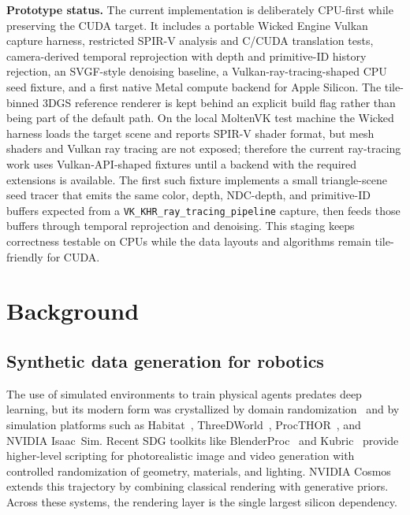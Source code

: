 \documentclass[10pt,journal,onecolumn]{IEEEtran}
\begin{document}
\textbf{Prototype status.} The current implementation is deliberately
CPU-first while preserving the CUDA target. It includes a portable
Wicked Engine Vulkan capture harness, restricted SPIR-V analysis and
C/CUDA translation tests, camera-derived temporal reprojection with
depth and primitive-ID history rejection, an SVGF-style denoising
baseline, a Vulkan-ray-tracing-shaped CPU seed fixture, and a first
native Metal compute backend for Apple Silicon. The
tile-binned 3DGS reference renderer is kept behind an explicit build
flag rather than being part of the default path. On the local MoltenVK
test machine the Wicked harness loads the target scene and reports
SPIR-V shader format, but mesh shaders and Vulkan ray tracing are not
exposed; therefore the current ray-tracing work uses
Vulkan-API-shaped fixtures until a backend with the required extensions
is available. The first such fixture implements a small triangle-scene
seed tracer that emits the same color, depth, NDC-depth, and
primitive-ID buffers expected from a
\texttt{VK\_KHR\_ray\_tracing\_pipeline} capture, then feeds those
buffers through temporal reprojection and denoising. This staging keeps
correctness testable on CPUs while the data layouts and algorithms
remain tile-friendly for CUDA.

\section{Background}\label{sec:bg}

\subsection{Synthetic data generation for robotics}

The use of simulated environments to train physical agents predates deep
learning, but its modern form was crystallized by domain
randomization~\cite{tobin2017domain} and by simulation platforms such as
Habitat~\cite{savva2019habitat}, ThreeDWorld~\cite{gan2020threedworld},
ProcTHOR~\cite{deitke2022procthor}, and NVIDIA Isaac~Sim. Recent SDG
toolkits like BlenderProc~\cite{denninger2019blenderproc} and
Kubric~\cite{greff2022kubric} provide higher-level scripting for
photorealistic image and video generation with controlled randomization
of geometry, materials, and lighting. NVIDIA Cosmos~\cite{nvidia2024cosmos}
extends this trajectory by combining classical rendering with generative
priors. Across these systems, the rendering layer is the single largest
silicon dependency.
\end{document}
